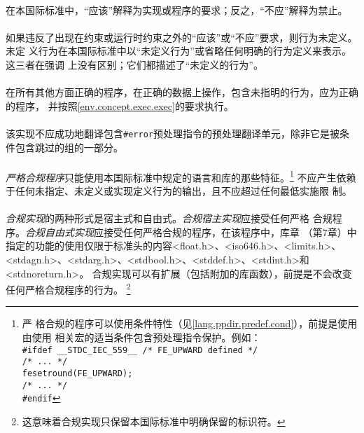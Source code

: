 
\paragraph{}
在本国际标准中，``应该''解释为实现或程序的要求；反之，``不应''解释为禁止。

\paragraph{}
如果违反了出现在约束或运行时约束之外的``应该''或``不应''要求，则行为未定义。未定
义行为在本国际标准中以``未定义行为''或省略任何明确的行为定义来表示。这三者在强调
上没有区别；它们都描述了``未定义的行为''。

\paragraph{}
在所有其他方面正确的程序，在正确的数据上操作，包含未指明的行为，应为正确的程序，
并按照\ref{env.concept.exec.exec}的要求执行。

\paragraph{}
该实现不应成功地翻译包含\texttt{\#error}预处理指令的预处理翻译单元，除非它是被条
件包含跳过的组的一部分。

\paragraph{}
\textit{严格合规程序}只能使用本国际标准中规定的语言和库的那些特征。\footnote{严
格合规的程序可以使用条件特性（见\ref{lang.ppdir.predef.cond}），前提是使用由使用
相关宏的适当条件包含预处理指令保护。例如：                                    \\
\mbox{\qquad\texttt{\#ifdef \_\_STDC\_IEC\_559\_\_ /* FE\_UPWARD defined */}} \\
\mbox{\qquad\qquad\texttt{/* ... */}}                                         \\
\mbox{\qquad\qquad\texttt{fesetround(FE\_UPWARD);}}                           \\
\mbox{\qquad\qquad\texttt{/* ... */}}                                         \\
\mbox{\qquad\texttt{\#endif}}
} 不应产生依赖于任何未指定、未定义或实现定义行为的输出，且不应超过任何最低实施限
制。

\paragraph{}
\textit{合规实现}的两种形式是宿主式和自由式。\textit{合规宿主实现}应接受任何严格
合规程序。\textit{合规自由式实现}应接受任何严格合规的程序，在该程序中，库章
（第7章）中指定的功能的使用仅限于标准头的内容<float.h>、<iso646.h>、<limits.h>、
<stdagn.h>、<stdarg.h>、<stdbool.h>、<stddef.h>、<stdint.h>和<stdnoreturn.h>。
合规实现可以有扩展（包括附加的库函数），前提是不会改变任何严格合规程序的行为。
\footnote{这意味着合规实现只保留本国际标准中明确保留的标识符。}


